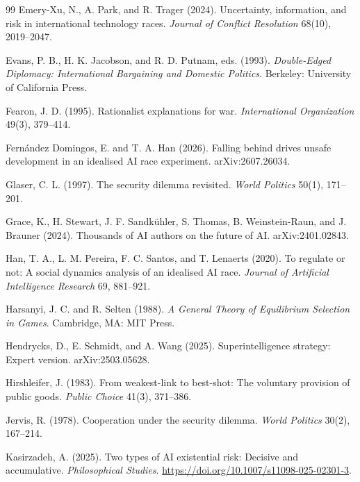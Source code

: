 \documentclass[11pt]{article}
\theoremstyle{plain}
\theoremstyle{definition}
\theoremstyle{remark}
\begin{document}
\begin{thebibliography}{99}
 Emery-Xu, N., A. Park, and R. Trager (2024). Uncertainty, information, and risk in international technology races. \emph{Journal of Conflict Resolution} 68(10), 2019--2047.

 Evans, P. B., H. K. Jacobson, and R. D. Putnam, eds. (1993). \emph{Double-Edged Diplomacy: International Bargaining and Domestic Politics}. Berkeley: University of California Press.

 Fearon, J. D. (1995). Rationalist explanations for war. \emph{International Organization} 49(3), 379--414.

 Fern\'andez Domingos, E. and T. A. Han (2026). Falling behind drives unsafe development in an idealised AI race experiment. arXiv:2607.26034.

 Glaser, C. L. (1997). The security dilemma revisited. \emph{World Politics} 50(1), 171--201.

 Grace, K., H. Stewart, J. F. Sandkühler, S. Thomas, B. Weinstein-Raun, and J. Brauner (2024). Thousands of AI authors on the future of AI. arXiv:2401.02843.

 Han, T. A., L. M. Pereira, F. C. Santos, and T. Lenaerts (2020). To regulate or not: A social dynamics analysis of an idealised AI race. \emph{Journal of Artificial Intelligence Research} 69, 881--921.

 Harsanyi, J. C. and R. Selten (1988). \emph{A General Theory of Equilibrium Selection in Games}. Cambridge, MA: MIT Press.

 Hendrycks, D., E. Schmidt, and A. Wang (2025). Superintelligence strategy: Expert version. arXiv:2503.05628.

 Hirshleifer, J. (1983). From weakest-link to best-shot: The voluntary provision of public goods. \emph{Public Choice} 41(3), 371--386.

 Jervis, R. (1978). Cooperation under the security dilemma. \emph{World Politics} 30(2), 167--214.

 Kasirzadeh, A. (2025). Two types of AI existential risk: Decisive and accumulative. \emph{Philosophical Studies}. \url{https://doi.org/10.1007/s11098-025-02301-3}.


\end{thebibliography}
\end{document}
